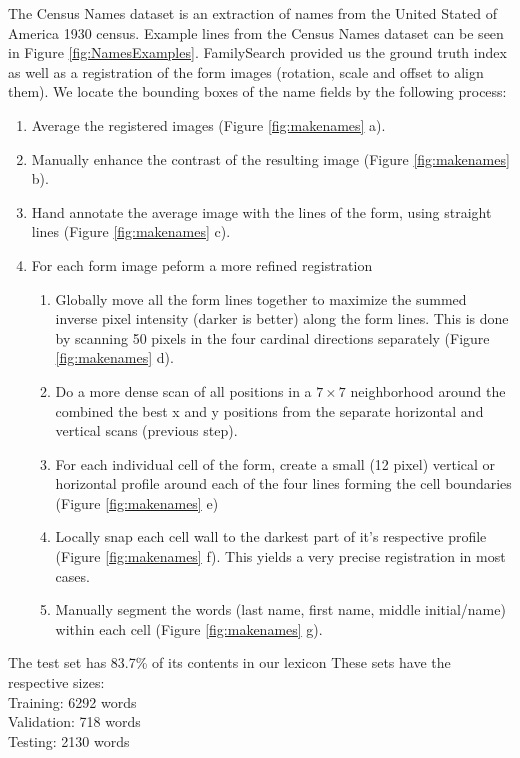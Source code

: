 \documentclass[ms,electronic,twosidetoc,letterpaper,chaptercenter,parttop,lof,lot]{byumsphd}
\begin{document}
The Census Names dataset is an extraction of names from the United Stated of America 1930 census. Example lines from the Census Names dataset can be seen in Figure \ref{fig:NamesExamples}. FamilySearch provided us the ground truth index as well as a  registration of the form images (rotation, scale and offset to align them). We locate the bounding boxes of the name fields by the following process:
\begin{enumerate}
 \item Average the registered images (Figure \ref{fig:makenames} a).
 \item Manually enhance the contrast of the resulting image (Figure \ref{fig:makenames} b). 
 \item Hand annotate the average image with the lines of the form, using straight lines (Figure \ref{fig:makenames} c). 
 \item For each form image peform a more refined registration %
 \begin{enumerate}
  \item Globally move all the form lines together to maximize the summed inverse pixel intensity (darker is better) along the form lines. This is done by scanning 50 pixels in the four cardinal directions separately (Figure \ref{fig:makenames} d). 
  \item Do a more dense scan of all positions in a $7\times 7$ neighborhood around the combined the best x and y positions from the separate horizontal and vertical scans (previous step). %
  \item For each individual cell of the form, create a small (12 pixel) vertical or horizontal profile  around each of the four lines forming the cell boundaries (Figure \ref{fig:makenames} e) 
  \item Locally snap each cell wall to the darkest part of it's respective profile (Figure \ref{fig:makenames} f). This yields a very precise registration in most cases. 
  \item Manually segment the words (last name, first name, middle initial/name) within each cell (Figure \ref{fig:makenames} g). 
 \end{enumerate}
\end{enumerate}
The test set has 83.7\% of its contents in our lexicon
These sets have the respective sizes:\\
\indent \indent Training: 6292 words\\
\indent \indent Validation: 718 words\\
\indent \indent Testing: 2130 words
\end{document}
